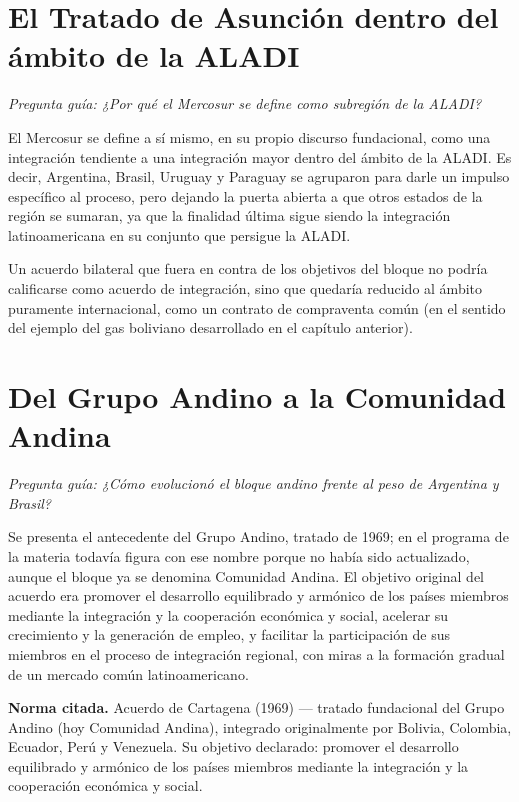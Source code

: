 \documentclass[12pt,oneside]{book}
\begin{document}
\section{El Tratado de Asunción dentro del ámbito de la ALADI}

\textit{Pregunta guía: ¿Por qué el Mercosur se define como subregión de la ALADI?}

El Mercosur se define a sí mismo, en su propio discurso fundacional, como una integración tendiente a una integración mayor dentro del ámbito de la ALADI. Es decir, Argentina, Brasil, Uruguay y Paraguay se agruparon para darle un impulso específico al proceso, pero dejando la puerta abierta a que otros estados de la región se sumaran, ya que la finalidad última sigue siendo la integración latinoamericana en su conjunto que persigue la ALADI.

Un acuerdo bilateral que fuera en contra de los objetivos del bloque no podría calificarse como acuerdo de integración, sino que quedaría reducido al ámbito puramente internacional, como un contrato de compraventa común (en el sentido del ejemplo del gas boliviano desarrollado en el capítulo anterior).

\section{Del Grupo Andino a la Comunidad Andina}

\textit{Pregunta guía: ¿Cómo evolucionó el bloque andino frente al peso de Argentina y Brasil?}

Se presenta el antecedente del Grupo Andino, tratado de 1969; en el programa de la materia todavía figura con ese nombre porque no había sido actualizado, aunque el bloque ya se denomina Comunidad Andina. El objetivo original del acuerdo era promover el desarrollo equilibrado y armónico de los países miembros mediante la integración y la cooperación económica y social, acelerar su crecimiento y la generación de empleo, y facilitar la participación de sus miembros en el proceso de integración regional, con miras a la formación gradual de un mercado común latinoamericano.

\begin{important}
\textbf{Norma citada.} Acuerdo de Cartagena (1969) — tratado fundacional del Grupo Andino (hoy Comunidad Andina), integrado originalmente por Bolivia, Colombia, Ecuador, Perú y Venezuela. Su objetivo declarado: promover el desarrollo equilibrado y armónico de los países miembros mediante la integración y la cooperación económica y social.
\end{important}
\end{document}

